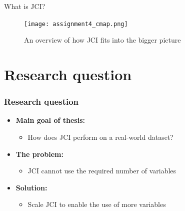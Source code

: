 \documentclass[10pt, compress]{beamer}
\begin{document}
\begin{frame}{What is JCI?} 
    
  \begin{figure}
    \centering
    \texttt{[image: assignment4\_cmap.png]}
    \caption{An overview of how JCI fits into the bigger picture}
  \end{figure}
\end{frame}

\section{Research question}
\begin{frame}
    \frametitle{Research question}
    \begin{itemize}
        \item \textbf{Main goal of thesis:}
            \begin{itemize}[<+- | alert@+>]
                \item How does JCI perform on a real-world dataset? 
            \end{itemize}
    
        \item\textbf{The problem:}
            \begin{itemize}[<+- | alert@+>]
                \item JCI cannot use the required number of variables
            \end{itemize}
    
        \item\textbf{Solution:}
            \begin{itemize}[<+- | alert@+>]
                \item Scale JCI to enable the use of more variables
            \end{itemize}
    \end{itemize}
\end{frame}
\end{document}
